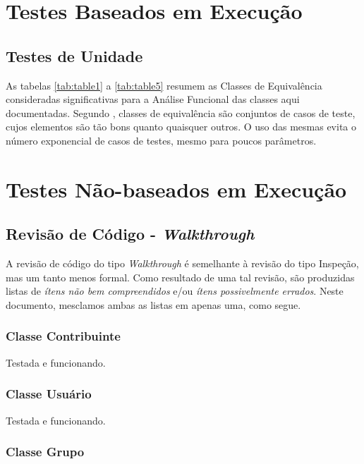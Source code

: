 \documentclass[11pt, a4paper]{book}
\begin{document}
\section{Testes Baseados em Execução}

\subsection{Testes de Unidade}
\label{sec:exec}

As tabelas \ref{tab:table1} a \ref{tab:table5} resumem as Classes de Equivalência consideradas significativas para a Análise Funcional das classes aqui documentadas. Segundo \citep{schach2007}, classes de equivalência são conjuntos de casos de teste, cujos elementos são tão bons quanto quaisquer outros. O uso das mesmas evita o número exponencial de casos de testes, mesmo para poucos parâmetros.

\section{Testes Não-baseados em Execução}
\label{sec:naoexec}

\subsection{Revisão de Código - \emph{Walkthrough}}

A revisão de código do tipo \emph{Walkthrough} é semelhante à revisão do tipo Inspeção, mas um tanto menos formal.  Como resultado de uma tal revisão, são produzidas listas de \emph{ítens não bem compreendidos} e/ou \emph{ítens possivelmente errados}\citep{schach2007}.
Neste documento, mesclamos ambas as listas em apenas uma, como segue.


\subsubsection{Classe Contribuinte}

Testada  e funcionando.

\subsubsection{Classe Usuário}

Testada e funcionando.

\subsubsection{Classe Grupo}
\end{document}
